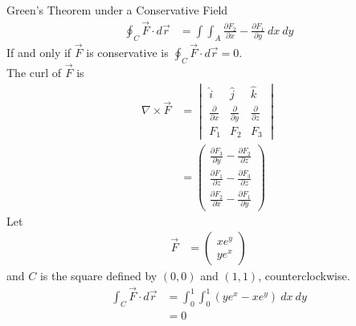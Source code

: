 \documentclass[8pt]{extarticle}
\begin{document}
  \begin{problem}{Green's Theorem under a Conservative Field}
    \begin{align*}
      \oint_{C}\vec{F}\cdot d\vec{r} &= \int\int_{A} \frac{\partial F_2}{\partial x} - \frac{\partial F_1}{\partial y} ~dx~dy
    \end{align*}
    If and only if $\vec{F}$ is conservative is $\oint_{C}\vec{F}\cdot d\vec{r} = 0$.\\

    The curl of $\vec{F}$ is
    \begin{align*}
      \nabla \times \vec{F} &= \begin{vmatrix}\hat{i} & \hat{j} & \hat{k} \\ \frac{\partial}{\partial x} & \frac{\partial}{\partial y} & \frac{\partial}{\partial z} \\ F_1 & F_2 & F_3\end{vmatrix}\\
                            &= \begin{pmatrix}\frac{\partial F_3}{\partial y} - \frac{\partial F_2}{\partial z} \\ \frac{\partial F_1}{\partial z} - \frac{\partial F_3}{\partial z} \\ \frac{\partial F_2}{\partial x} - \frac{\partial F_1}{\partial y}\end{pmatrix}
    \end{align*}
    Let
    \begin{align*}
      \vec{F} &= \begin{pmatrix}xe^y\\ye^x\end{pmatrix}
    \end{align*}
    and $C$ is the square defined by $(0,0)$ and $(1,1)$, counterclockwise.
    \begin{align*}
      \int_{C}\vec{F}\cdot d\vec{r} &= \int_{0}^{1}\int_{0}^{1} \left(ye^x - xe^y\right)~dx~dy\\
                                    &= 0
    \end{align*}
  \end{problem}
\end{document}
